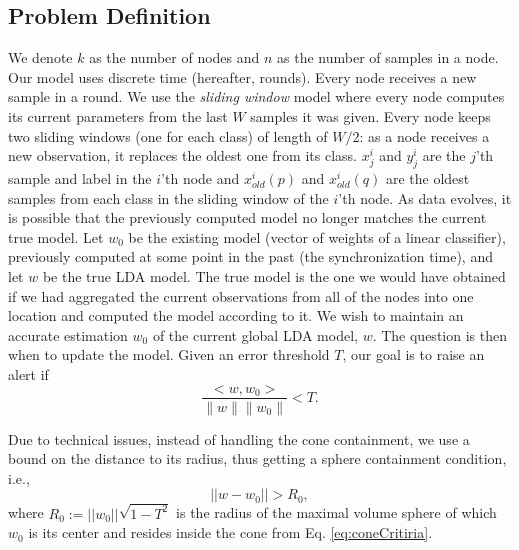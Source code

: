 \subsection{Problem Definition}
We denote $k$ as the number of nodes and
$n$ as the number of samples in a node.
Our model uses discrete time (hereafter, rounds). Every node receives a new sample
in a round.
We use the \textit{sliding window} model where every node computes its current
parameters from the last $W$ samples it was given.
Every node keeps two sliding windows (one for each class) of length of $W/2$: 
as a node receives a new observation, it replaces the oldest one from its class.
$x^i_j$ and $y^i_j$ are the $j$'th sample and label in the $i$'th node
and $x_{old}^i(p)$ and $x_{old}^i(q)$ are the oldest samples from each class in
the sliding window of the $i$'th node.
As data evolves, it is possible that the previously computed model
no longer matches the current true model.
Let $w_0$ be the existing model (vector of weights of a linear classifier),
previously computed at some point in the past (the synchronization time),
and let $w$ be the true LDA model.
The true model is the one we would have obtained if we had aggregated the current observations from all of the nodes into one location and computed the model according to it.
We wish to maintain an accurate estimation $w_0$ of the current global LDA model, $w$.
The question is then when to update the model.
Given an error threshold $T$, our goal is to raise an alert if
\begin{equation} \label{eq:coneCritiria}
\frac{<w,w_0>}{\parallel w \parallel \parallel w_0 \parallel}  < T.
\end{equation}

Due to technical issues, instead of handling the cone containment, we use a bound on the distance to its radius, thus getting a sphere containment condition, i.e., 
\begin{equation} \label{eq:critiria}
||w-w_0||   >  R_0,
\end{equation}
where $R_0 := ||w_0|| \sqrt{1-T^2}$ is the radius of the maximal volume sphere of which $w_0$ is its center and resides inside the cone from Eq. \ref{eq:coneCritiria}.


